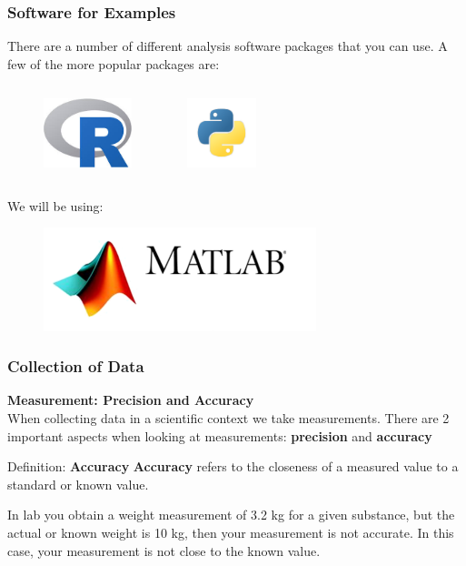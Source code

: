 \documentclass{beamer}
\begin{document}

\begin{frame}
\frametitle{Software for Examples}
There are a number of different analysis software packages that you can use. A few of the more popular packages are: 
\begin{columns}[b]
\begin{figure}
\includegraphics[height=2cm]{R}
\end{figure}
\includegraphics[height=2cm]{python}
\end{columns}
\vspace{0.5cm}
We will be using:
\begin{figure}
\includegraphics[height=3cm]{MATLAB-Logo}
\end{figure}
\end{frame}


\begin{frame}
\frametitle{Collection of Data}
\textbf{Measurement: Precision and Accuracy}\\
\vspace{0.5cm}
When collecting data in a scientific context we take measurements. There are 2 important aspects when looking at measurements: \textbf{precision} and \textbf{accuracy}
\vspace{0.5cm}
\begin{block}{Definition: \textbf{Accuracy}}
\textbf{Accuracy} refers to the closeness of a measured value to a standard or known value.
\end{block}
\begin{example}
In lab you obtain a weight measurement of 3.2 kg for a given substance, but the actual or known weight is 10 kg, then your measurement is not accurate. In this case, your measurement is not close to the known value.
\end{example}
\end{frame}
\end{document}
